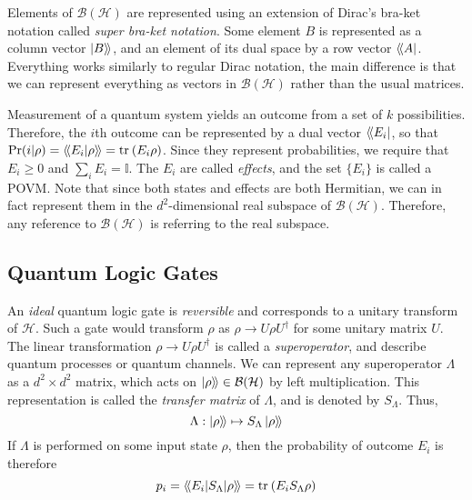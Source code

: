 Elements of $\mathcal{B(H)}$ are represented using an extension of Dirac's bra-ket notation called
\textit{super bra-ket notation}. Some element $B$ is represented as a column vector $\ket{B}\!\rangle$,
and an element of its dual space by a row vector $\langle\!\bra{A}$. Everything works similarly to
regular Dirac notation, the main difference is that we can represent everything as vectors in
$\mathcal{B(H)}$ rather than the usual matrices.

Measurement of a quantum system yields an outcome from a set of $k$ possibilities. Therefore, the
$i$th outcome can be represented by a dual vector $\langle\!\bra{E_i}$, so that $\Pr(i | \rho) =
\langle\!\braket{E_i | \rho}\!\rangle = \text{tr}_{}\left(E_i \rho\right)$. Since they represent probabilities, we require that $E_i
\ge 0$ and $\sum_i E_i = \mathbb{I}$. The $E_i$ are called \textit{effects}, and the set $\{E_i \}$
is called a \ac{POVM}.  Note that since both states and effects are both Hermitian, we can in fact
represent them in the $d^2$-dimensional real subspace of $\mathcal{B(H)}$. Therefore, any reference
to $\mathcal{B(H)}$ is referring to the real subspace.

\subsection{Quantum Logic Gates}

An \textit{ideal} quantum logic gate is \textit{reversible} and corresponds to a unitary transform
of $\mathcal{H}$. Such a gate would transform $\rho$ as $\rho \to U \rho U^{\dagger}$ for some
unitary matrix $U$. The linear transformation $\rho \to U \rho U^{\dagger}$ is called a
\textit{superoperator}, and describe quantum processes or quantum channels. We can represent any
superoperator $\Lambda$ as a $d^2 \times d^2$ matrix, which acts on $\ket{\rho}\!\rangle \in
\mathcal{B(H)}$ by left multiplication. This representation is called the \textit{transfer matrix}
of $\Lambda$, and is denoted by $S_{\Lambda}$. Thus,
\begin{equation}
    \Lambda : \ket{\rho}\!\rangle \mapsto S_{\Lambda} \ket{\rho}\!\rangle
\end{equation}
If $\Lambda$ is performed on some input state $\rho$, then the probability of outcome $E_i$ is
therefore
\begin{equation}
    p_i = \langle\!\braket{E_i | S_{\Lambda} | \rho}\!\rangle = \text{tr}_{}\left(E_i S_{\Lambda} \rho\right)
\end{equation}

